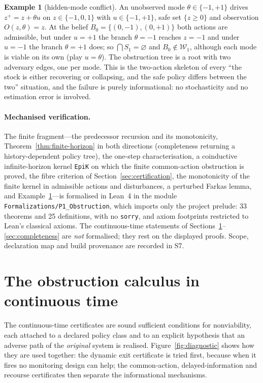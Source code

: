 \documentclass[11pt,a4paper]{article}
\theoremstyle{plain}
\theoremstyle{definition}
\newtheorem{example}[theorem]{Example}
\theoremstyle{remark}
\newcommand{\cW}{\mathcal{W}}
\begin{document}
\begin{example}[hidden-mode conflict]\label{ex:hidden-mode}
An unobserved mode $\theta\in\{-1,+1\}$ drives $z^+=z+\theta u$ on $z\in\{-1,0,1\}$ with $u\in\{-1,+1\}$, safe set $\{z\ge0\}$ and observation $O(z,\theta)=z$. At the belief $B_0=\{(0,-1),(0,+1)\}$ both actions are admissible, but under $u=+1$ the branch $\theta=-1$ reaches $z=-1$ and under $u=-1$ the branch $\theta=+1$ does; so $\bigcap S_1=\varnothing$ and $B_0\notin\cW_1$, although each mode is viable on its own (play $u=\theta$). The obstruction tree is a root with two adversary edges, one per mode. This is the two-action skeleton of every ``the stock is either recovering or collapsing, and the safe policy differs between the two'' situation, and the failure is purely informational: no stochasticity and no estimation error is involved.
\end{example}

\paragraph{Mechanised verification.} The finite fragment---the predecessor recursion and its monotonicity, Theorem~\ref{thm:finite-horizon} in both directions (completeness returning a history-dependent policy tree), the one-step characterisation, a coinductive infinite-horizon kernel \texttt{EpiK} on which the finite common-action obstruction is proved, the fibre criterion of Section~\ref{sec:certification}, the monotonicity of the finite kernel in admissible actions and disturbances, a perturbed Farkas lemma, and Example~\ref{ex:hidden-mode}---is formalised in Lean~4 in the module \texttt{Formalizations/P1\_Obstruction}, which imports only the project prelude: 33 theorems and 25 definitions, with no \texttt{sorry}, and axiom footprints restricted to Lean's classical axioms. The continuous-time statements of Sections~\ref{sec:calculus}--\ref{sec:completeness} are \emph{not} formalised; they rest on the displayed proofs. Scope, declaration map and build provenance are recorded in S7.
\section{The obstruction calculus in continuous time}\label{sec:calculus}

The continuous-time certificates are sound sufficient conditions for nonviability, each attached to a declared policy class and to an explicit hypothesis that an adverse path of the \emph{original} system is realised. Figure~\ref{fig:diagnostic} shows how they are used together: the dynamic exit certificate is tried first, because when it fires no monitoring design can help; the common-action, delayed-information and recourse certificates then separate the informational mechanisms.
\end{document}
